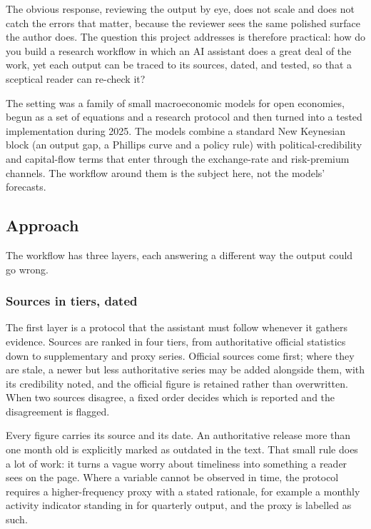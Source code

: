 \documentclass[
  british,
  a4paper,
]{article}
\begin{document}
The obvious response, reviewing the output by eye, does not scale and
does not catch the errors that matter, because the reviewer sees the
same polished surface the author does. The question this project
addresses is therefore practical: how do you build a research workflow
in which an AI assistant does a great deal of the work, yet each output
can be traced to its sources, dated, and tested, so that a sceptical
reader can re-check it?

The setting was a family of small macroeconomic models for open
economies, begun as a set of equations and a research protocol and then
turned into a tested implementation during 2025. The models combine a
standard New Keynesian block (an output gap, a Phillips curve and a
policy rule) with political-credibility and capital-flow terms that
enter through the exchange-rate and risk-premium channels. The workflow
around them is the subject here, not the models' forecasts.

\subsection{Approach}\label{approach}

The workflow has three layers, each answering a different way the output
could go wrong.

\subsubsection{Sources in tiers, dated}\label{sources-in-tiers-dated}

The first layer is a protocol that the assistant must follow whenever it
gathers evidence. Sources are ranked in four tiers, from authoritative
official statistics down to supplementary and proxy series. Official
sources come first; where they are stale, a newer but less authoritative
series may be added alongside them, with its credibility noted, and the
official figure is retained rather than overwritten. When two sources
disagree, a fixed order decides which is reported and the disagreement
is flagged.

Every figure carries its source and its date. An authoritative release
more than one month old is explicitly marked as outdated in the text.
That small rule does a lot of work: it turns a vague worry about
timeliness into something a reader sees on the page. Where a variable
cannot be observed in time, the protocol requires a higher-frequency
proxy with a stated rationale, for example a monthly activity indicator
standing in for quarterly output, and the proxy is labelled as such.
\end{document}
